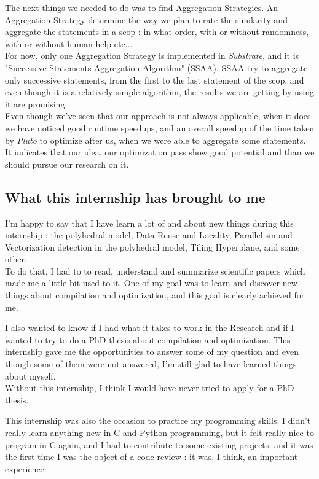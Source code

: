 \documentclass[paper=a4, fontsize=11.5pt]{scrartcl}
\numberwithin{equation}{section}        %
\numberwithin{figure}{section}          %
\numberwithin{table}{section}               %
\begin{document}
The next things we needed to do was to find Aggregation Strategies. An Aggregation Strategy
determine the way we plan to rate the similarity and aggregate the statements in a scop : in what
order, with or without randomness, with or without human help etc...\\
For now, only one Aggregation Strategy is implemented in \textit{Substrate},
and it is "Successive Statements Aggregation Algorithm" (SSAA).
SSAA try to aggregate only successive statements, from the first to the last
statement of the scop, and even though it is a relatively simple algorithm, the results we
are getting by using it are promising.\\
Even though we've seen that our approach is not always applicable, when it does
we have noticed good runtime speedups, and an overall speedup of the time taken by \textit{Pluto}
to optimize after us, when we were able to aggregate some statements. It indicates that our idea,
our optimization pass show good potential and than we should pursue our research on it.

    \subsection{What this internship has brought to me}
        I'm happy to say that I have learn a lot of and about new things during this internship :
        the polyhedral model, Data Reuse and Locality, Parallelism and Vectorization detection
        in the polyhedral model, Tiling Hyperplane, and some other.\\
        To do that, I had to to read, understand and summarize scientific papers which made
        me a little bit used to it.
        One of my goal was to learn and discover new things about compilation and optimization,
        and this goal is clearly achieved for me.

        I also wanted to know if I had what it takes to work in the Research and if I wanted
        to try to do a PhD thesis about compilation and optimization. This internship gave me
        the opportunities to answer some of my question and even though some of them were
        not answered, I'm still glad to have learned things about myself.\\
        Without this internship, I think I would have never tried to apply for a PhD thesis.

        This internship was also the occasion to practice my programming skills. I didn't
        really learn anything new in C and Python programming, but it felt really nice to
        program in C again, and I had to contribute to some existing projects, and it was
        the first time I was the object of a code review : it was, I think, an important experience.
\end{document}
